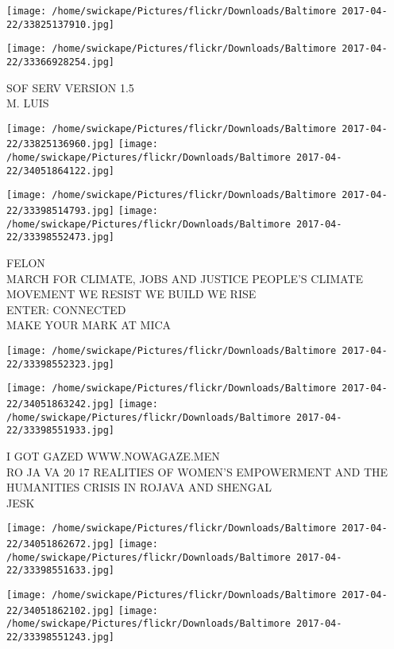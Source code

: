 \documentclass[10pt,letterpaper]{article}
\begin{document}
\texttt{[image: /home/swickape/Pictures/flickr/Downloads/Baltimore 2017-04-22/33825137910.jpg]}

\vspace{0.25in}
\texttt{[image: /home/swickape/Pictures/flickr/Downloads/Baltimore 2017-04-22/33366928254.jpg]}

SOF SERV VERSION 1.5\\
M. LUIS
\pagebreak

\texttt{[image: /home/swickape/Pictures/flickr/Downloads/Baltimore 2017-04-22/33825136960.jpg]}
\texttt{[image: /home/swickape/Pictures/flickr/Downloads/Baltimore 2017-04-22/34051864122.jpg]}

\texttt{[image: /home/swickape/Pictures/flickr/Downloads/Baltimore 2017-04-22/33398514793.jpg]}
\texttt{[image: /home/swickape/Pictures/flickr/Downloads/Baltimore 2017-04-22/33398552473.jpg]}

FELON\\
MARCH FOR CLIMATE, JOBS AND JUSTICE PEOPLE'S CLIMATE MOVEMENT WE RESIST WE BUILD WE RISE\\
ENTER: CONNECTED\\
MAKE YOUR MARK AT MICA
\pagebreak

\texttt{[image: /home/swickape/Pictures/flickr/Downloads/Baltimore 2017-04-22/33398552323.jpg]}

\vspace{0.25in}
\texttt{[image: /home/swickape/Pictures/flickr/Downloads/Baltimore 2017-04-22/34051863242.jpg]}
\texttt{[image: /home/swickape/Pictures/flickr/Downloads/Baltimore 2017-04-22/33398551933.jpg]}

I GOT GAZED WWW.NOWAGAZE.MEN\\
RO JA VA 20 17 REALITIES OF WOMEN'S EMPOWERMENT AND THE HUMANITIES CRISIS IN ROJAVA AND SHENGAL\\
JESK
\pagebreak

\texttt{[image: /home/swickape/Pictures/flickr/Downloads/Baltimore 2017-04-22/34051862672.jpg]}
\texttt{[image: /home/swickape/Pictures/flickr/Downloads/Baltimore 2017-04-22/33398551633.jpg]}

\texttt{[image: /home/swickape/Pictures/flickr/Downloads/Baltimore 2017-04-22/34051862102.jpg]}
\texttt{[image: /home/swickape/Pictures/flickr/Downloads/Baltimore 2017-04-22/33398551243.jpg]}
\end{document}
